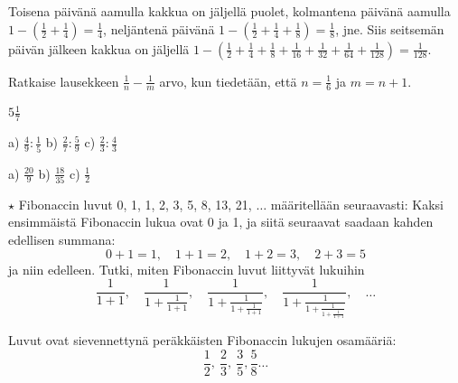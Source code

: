 \begin{tehtavasivu}
\begin{tehtava}
        \begin{vastaus}
            Toisena päivänä aamulla kakkua on jäljellä puolet, kolmantena
            päivänä aamulla
                $1-\left(\frac{1}{2} + \frac{1}{4}\right) = \frac{1}{4}$, 
            neljäntenä päivänä
                $1-\left(\frac{1}{2} + \frac{1}{4} + \frac{1}{8}\right)
                = \frac{1}{8}$, jne.
            Siis seitsemän päivän jälkeen kakkua on jäljellä
                $1-\left(\frac{1}{2} + \frac{1}{4} + \frac{1}{8} +
                \frac{1}{16} + \frac{1}{32} + \frac{1}{64} + \frac{1}{128}\right)
                = \frac{1}{128}$.  
        \end{vastaus}
    \end{tehtava}

    \begin{tehtava} %
Ratkaise lausekkeen $\frac{1}{n}-\frac{1}{m}$ arvo, kun tiedetään, että $n = \frac{1}{6}$ ja $m=n+1$.
        \begin{vastaus}
            $5 \frac{1}{7}$
        \end{vastaus}
    \end{tehtava}


\begin{tehtava}
a) $\frac{4}{9} : \frac{1}{5}$ \qquad b) $\frac{2}{7}:\frac{5}{9}$ \qquad c) $\frac{2}{3}:\frac{4}{3}$
\begin{vastaus}
a) $\frac{20}{9}$ \qquad b) $\frac{18}{35}$ \qquad c) $\frac{1}{2}$
\end{vastaus}
\end{tehtava}

\begin{tehtava}
$\star$ Fibonaccin luvut 0, 1, 1, 2, 3, 5, 8, 13, 21, $\ldots$ määritellään seuraavasti: Kaksi ensimmäistä
Fibonaccin lukua ovat 0 ja 1, ja siitä seuraavat saadaan kahden
edellisen summana: 
\[ 0+1=1, \quad 1+1=2, \quad 1+2 = 3, \quad 2+3=5 \] 
ja niin edelleen. 
Tutki, miten Fibonaccin luvut liittyvät lukuihin
\[ \frac{1}{1+1}, \quad \frac{1}{1+\frac{1}{1+1}}, \quad
\frac{1}{1+\frac{1}{1+\frac{1}{1+1}}}, \quad 
\frac{1}{1+\frac{1}{1+\frac{1}{1+\frac{1}{1+1}}}}, \quad \ldots\]
\begin{vastaus}
Luvut ovat sievennettynä peräkkäisten Fibonaccin
lukujen osamääriä:
\[\frac{1}{2}, \ \frac{2}{3}, \ \frac{3}{5}, \frac{5}{8} \ldots  \]
\end{vastaus}
\end{tehtava}


\end{tehtavasivu}